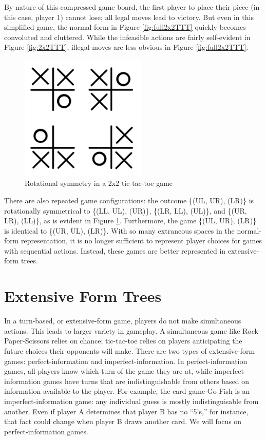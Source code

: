 By nature of this compressed game board, the first player to place their piece (in this case, player 1) cannot lose; all legal moves lead to victory. But even in this simplified game, the normal form in Figure \ref{fig:full2x2TTT} quickly becomes convoluted and cluttered. While the infeasible actions are fairly self-evident in Figure \ref{fig:2x2TTT}, illegal moves are less obvious in Figure \ref{fig:full2x2TTT}.
\begin{figure}[H]
  \centering
  \includegraphics[width=6cm]{figures/TTTRotation.png}
  \caption{Rotational symmetry in a 2x2 tic-tac-toe game}
  \label{fig:2x2TTTRotation}
\end{figure}
There are also repeated game configurations: the outcome \{(UL, UR), (LR)\} is rotationally symmetrical to \{(LL, UL), (UR)\}, \{(LR, LL), (UL)\}, and \{(UR, LR), (LL)\}, as is evident in Figure \ref{fig:2x2TTTRotation}. Furthermore, the game \{(UL, UR), (LR)\} is identical to \{(UR, UL), (LR)\}. With so many extraneous spaces in the normal-form representation, it is no longer sufficient to represent player choices for games with sequential actions. Instead, these games are better represented in extensive-form trees.\\

\section{Extensive Form Trees}
In a turn-based, or extensive-form game, players do not make simultaneous actions. This leads to larger variety in gameplay. A simultaneous game like Rock-Paper-Scissors relies on chance; tic-tac-toe relies on players anticipating the future choices their opponents will make. There are two types of extensive-form games: perfect-information and imperfect-information. In perfect-information games, all players know which turn of the game they are at, while imperfect-information games have turns that are indistinguishable from others based on information available to the player. For example, the card game Go Fish is an imperfect-information game: any individual guess is mostly indistinguisable from another. Even if player A determines that player B has no ``5's,'' for instance, that fact could change when player B draws another card. We will focus on perfect-information games.\\

